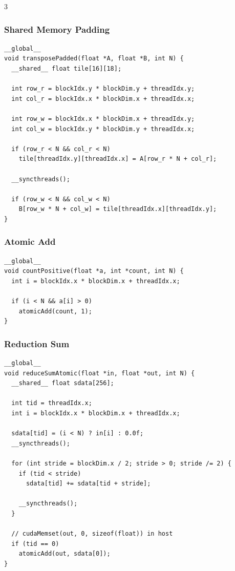 \documentclass[12pt, a4paper]{article}
\begin{document}
\begin{multicols*}{3}
\subsubsection{Shared Memory Padding}
\begin{lstlisting}[basicstyle=\ttfamily\scriptsize]
__global__
void transposePadded(float *A, float *B, int N) {
  __shared__ float tile[16][18];

  int row_r = blockIdx.y * blockDim.y + threadIdx.y;
  int col_r = blockIdx.x * blockDim.x + threadIdx.x;

  int row_w = blockIdx.x * blockDim.x + threadIdx.y;
  int col_w = blockIdx.y * blockDim.y + threadIdx.x;

  if (row_r < N && col_r < N)
    tile[threadIdx.y][threadIdx.x] = A[row_r * N + col_r];

  __syncthreads();

  if (row_w < N && col_w < N)
    B[row_w * N + col_w] = tile[threadIdx.x][threadIdx.y];
}
\end{lstlisting}

\colbreak
\subsubsection{Atomic Add}
\begin{lstlisting}[basicstyle=\ttfamily\scriptsize]
__global__
void countPositive(float *a, int *count, int N) {
  int i = blockIdx.x * blockDim.x + threadIdx.x;

  if (i < N && a[i] > 0)
    atomicAdd(count, 1);
}
\end{lstlisting}

\subsubsection{Reduction Sum}
\begin{lstlisting}[basicstyle=\ttfamily\scriptsize]
__global__
void reduceSumAtomic(float *in, float *out, int N) {
  __shared__ float sdata[256];

  int tid = threadIdx.x;
  int i = blockIdx.x * blockDim.x + threadIdx.x;

  sdata[tid] = (i < N) ? in[i] : 0.0f;
  __syncthreads();

  for (int stride = blockDim.x / 2; stride > 0; stride /= 2) {
    if (tid < stride)
      sdata[tid] += sdata[tid + stride];

    __syncthreads();
  }

  // cudaMemset(out, 0, sizeof(float)) in host
  if (tid == 0)
    atomicAdd(out, sdata[0]);
}
\end{lstlisting}

\end{multicols*}
\end{document}
